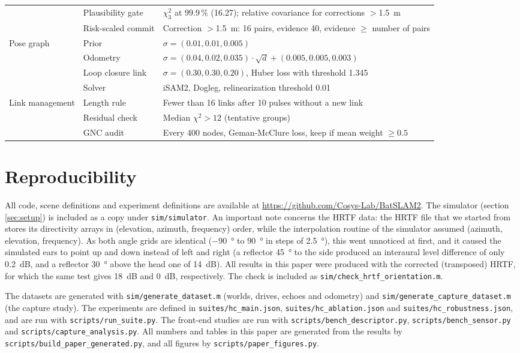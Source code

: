 \begin{table}[t]
{\begin{tabular}{lll}
 & Plausibility gate & $\chi^2_3$ at 99.9\,\% (16.27); relative covariance for corrections $>$\SI{1.5}{\meter} \\
 & Risk-scaled commit & Correction $>$\SI{1.5}{\meter}: 16 pairs, evidence 40, evidence $\ge$ number of pairs \\
Pose graph & Prior & $\sigma = (0.01, 0.01, 0.005)$ \\
 & Odometry & $\sigma = (0.04, 0.02, 0.035) \cdot \sqrt{d} + (0.005, 0.005, 0.003)$ \\
 & Loop closure link & $\sigma = (0.30, 0.30, 0.20)$, Huber loss with threshold 1.345 \\
 & Solver & iSAM2, Dogleg, relinearization threshold 0.01 \\
Link management & Length rule & Fewer than 16 links after 10 pulses without a new link \\
 & Residual check & Median $\chi^2 > 12$ (tentative groups) \\
 & GNC audit & Every 400 nodes, Geman-McClure loss, keep if mean weight $\ge 0.5$ \\
\bottomrule
\end{tabular}}
\end{table}

\section{Reproducibility}
\label{app:repro}
All code, scene definitions and experiment definitions are available at \url{https://github.com/Cosys-Lab/BatSLAM2}. The simulator (section \ref{sec:setup}) is included as a copy under \texttt{sim/simulator}. An important note concerns the HRTF data: the HRTF file that we started from stores its directivity arrays in (elevation, azimuth, frequency) order, while the interpolation routine of the simulator assumed (azimuth, elevation, frequency). As both angle grids are identical ($-$\SI{90}{\degree} to \SI{90}{\degree} in steps of \SI{2.5}{\degree}), this went unnoticed at first, and it caused the simulated ears to point up and down instead of left and right (a reflector \SI{45}{\degree} to the side produced an interaural level difference of only \SI{0.2}{\deci\bel}, and a reflector \SI{30}{\degree} above the head one of \SI{14}{\deci\bel}). All results in this paper were produced with the corrected (transposed) HRTF, for which the same test gives \SI{18}{\deci\bel} and \SI{0}{\deci\bel}, respectively. The check is included as \texttt{sim/check\_hrtf\_orientation.m}.

The datasets are generated with \texttt{sim/generate\_dataset.m} (worlds, drives, echoes and odometry) and \texttt{sim/generate\_capture\_dataset.m} (the capture study). The experiments are defined in \texttt{suites/hc\_main.json}, \texttt{suites/hc\_ablation.json} and \texttt{suites/hc\_robustness.json}, and are run with \texttt{scripts/run\_suite.py}. The front-end studies are run with \texttt{scripts/bench\_descriptor.py}, \texttt{scripts/bench\_sensor.py} and \texttt{scripts/capture\_analysis.py}. All numbers and tables in this paper are generated from the results by \texttt{scripts/build\_paper\_generated.py}, and all figures by \texttt{scripts/paper\_figures.py}.


